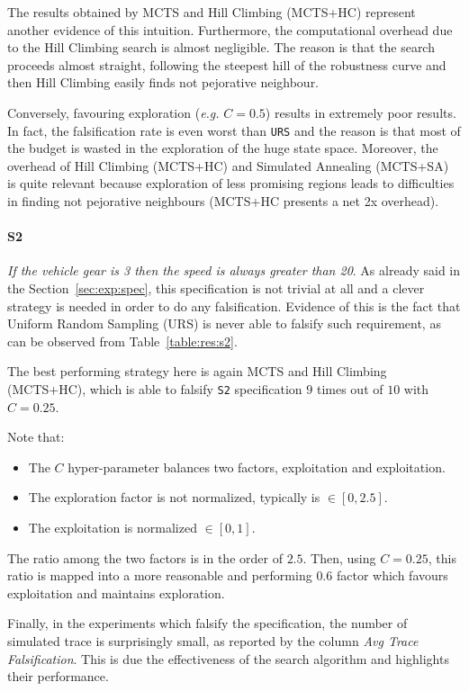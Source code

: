 \documentclass[11pt]{article}
\begin{document}
The results obtained by MCTS and Hill Climbing (MCTS+HC) represent another evidence of this intuition. Furthermore, the computational overhead due to the Hill Climbing search is almost negligible. The reason is that the search proceeds almost straight, following the steepest hill of the robustness curve and then Hill Climbing easily finds not pejorative neighbour. 

Conversely, favouring exploration (\textit{e.g.} $C=0.5$) results in extremely poor results. In fact, the falsification rate is even worst than \texttt{URS} and the reason is that most of the budget is wasted in the exploration of the huge state space. Moreover, the overhead of Hill Climbing (MCTS+HC) and Simulated Annealing (MCTS+SA) is quite relevant because exploration of less promising regions leads to difficulties in finding not pejorative neighbours (MCTS+HC presents a net 2x overhead).

\paragraph{S2} \textit{If the vehicle gear is 3 then the speed is always greater than 20}.
As already said in the Section~\ref{sec:exp:spec}, this specification is not trivial at all and a clever strategy is needed in order to do any falsification.
Evidence of this is the fact that Uniform Random Sampling (URS) is never able to falsify such requirement, as can be observed from Table~\ref{table:res:s2}.

The best performing strategy here is again MCTS and Hill Climbing (MCTS+HC), which is able to falsify \texttt{S2} specification $9$ times out of $10$ with $C=0.25$.

Note that:
\begin{itemize}
    \item The $C$ hyper-parameter balances two factors, exploitation and exploitation.
    \item The exploration factor is not normalized, typically is $\in [0,2.5]$.
    \item The exploitation is normalized $\in [0,1]$.
\end{itemize}
The ratio among the two factors is in the order of $2.5$. Then, using $C=0.25$, this ratio is mapped into a more reasonable and performing $0.6$ factor which favours exploitation and maintains exploration.

Finally, in the experiments which falsify the specification, the number of simulated trace is surprisingly small, as reported by the column \textit{Avg Trace Falsification}. This is due the effectiveness of the search algorithm and highlights their performance.
\end{document}
